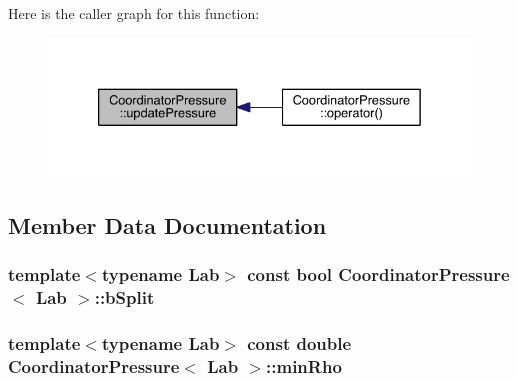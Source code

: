 Here is the caller graph for this function\+:\nopagebreak
\begin{figure}[H]
\begin{center}
\leavevmode
\includegraphics[width=333pt]{df/ddf/class_coordinator_pressure_aae191598a19a01d08447b56db0a103c6_icgraph}
\end{center}
\end{figure}




\subsection{Member Data Documentation}
\hypertarget{class_coordinator_pressure_a1d8aff04fd9982cf13b3822280d457cd}{}
\subsubsection[{b\+Split}]{\setlength{\rightskip}{0pt plus 5cm}template$<$typename Lab$>$ const bool {\bf Coordinator\+Pressure}$<$ Lab $>$\+::b\+Split\hspace{0.3cm}{\ttfamily [protected]}}\label{class_coordinator_pressure_a1d8aff04fd9982cf13b3822280d457cd}
\hypertarget{class_coordinator_pressure_abd9e4e2c3495a826d10e8476260f3284}{}
\subsubsection[{min\+Rho}]{\setlength{\rightskip}{0pt plus 5cm}template$<$typename Lab$>$ const double {\bf Coordinator\+Pressure}$<$ Lab $>$\+::min\+Rho\hspace{0.3cm}{\ttfamily [protected]}}\label{class_coordinator_pressure_abd9e4e2c3495a826d10e8476260f3284}
\hypertarget{class_coordinator_pressure_ae31ae2e6b1f6a95fb7be1af288adce4e}{}
